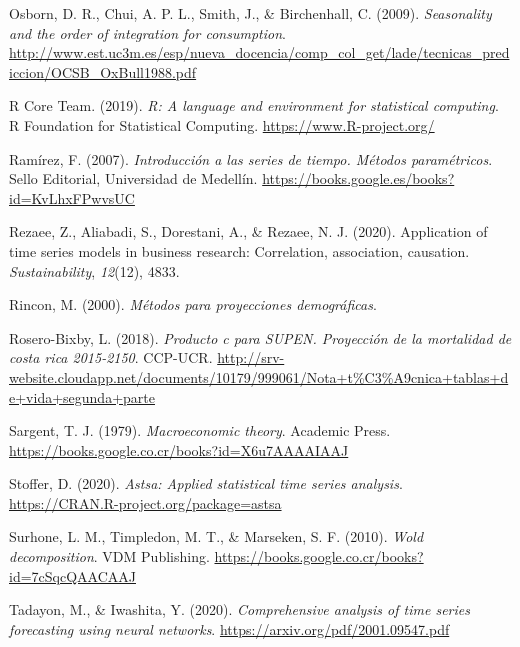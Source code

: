 \documentclass[
]{article}
\newlength{\cslhangindent}
\newlength{\cslentryspacingunit} %
\newenvironment{CSLReferences}[2] %
 {%
  \setlength{\parindent}{0pt}
  \ifodd #1
  \let\oldpar\par
  \def\par{\hangindent=\cslhangindent\oldpar}
  \fi
  \setlength{\parskip}{#2\cslentryspacingunit}
 }%
 {}
\begin{document}
\begin{CSLReferences}{1}{0}
\leavevmode{}%
Osborn, D. R., Chui, A. P. L., Smith, J., \& Birchenhall, C. (2009).
\emph{Seasonality and the order of integration for consumption}.
\url{http://www.est.uc3m.es/esp/nueva_docencia/comp_col_get/lade/tecnicas_prediccion/OCSB_OxBull1988.pdf}

\leavevmode{}%
R Core Team. (2019). \emph{R: A language and environment for statistical
computing}. R Foundation for Statistical Computing.
\url{https://www.R-project.org/}

\leavevmode{}%
Ramírez, F. (2007). \emph{Introducción a las series de tiempo. Métodos
paramétricos}. Sello Editorial, Universidad de Medellín.
\url{https://books.google.es/books?id=KvLhxFPwvsUC}

\leavevmode{}%
Rezaee, Z., Aliabadi, S., Dorestani, A., \& Rezaee, N. J. (2020).
Application of time series models in business research: Correlation,
association, causation. \emph{Sustainability}, \emph{12}(12), 4833.

\leavevmode{}%
Rincon, M. (2000). \emph{Métodos para proyecciones demográficas}.

\leavevmode{}%
Rosero-Bixby, L. (2018). \emph{Producto c para SUPEN. Proyección de la
mortalidad de costa rica 2015-2150}. CCP-UCR.
\url{http://srv-website.cloudapp.net/documents/10179/999061/Nota+t\%C3\%A9cnica+tablas+de+vida+segunda+parte}

\leavevmode{}%
Sargent, T. J. (1979). \emph{Macroeconomic theory}. Academic Press.
\url{https://books.google.co.cr/books?id=X6u7AAAAIAAJ}

\leavevmode{}%
Stoffer, D. (2020). \emph{Astsa: Applied statistical time series
analysis}. \url{https://CRAN.R-project.org/package=astsa}

\leavevmode{}%
Surhone, L. M., Timpledon, M. T., \& Marseken, S. F. (2010). \emph{Wold
decomposition}. VDM Publishing.
\url{https://books.google.co.cr/books?id=7cSqcQAACAAJ}

\leavevmode{}%
Tadayon, M., \& Iwashita, Y. (2020). \emph{Comprehensive analysis of
time series forecasting using neural networks}.
\url{https://arxiv.org/pdf/2001.09547.pdf}


\end{CSLReferences}
\end{document}
